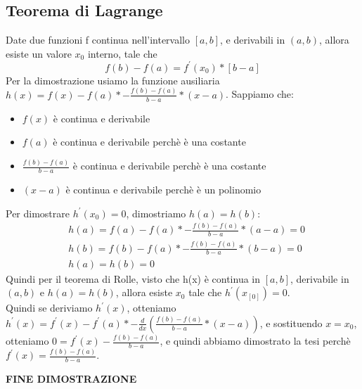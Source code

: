 \documentclass[11pt]{article}
\begin{document}
\subsection{Teorema di Lagrange}
Date due funzioni f continua nell'intervallo $[a,b]$, e derivabili in $(a,b)$, allora esiste un valore $x_{0}$ interno, tale che $$f(b)-f(a) = f^{'}(x_{0})*[b-a]$$
Per la dimostrazione usiamo la funzione ausiliaria $h(x) = f(x) - f(a)*-\frac{f(b)-f(a)}{b-a}*(x-a)$. Sappiamo che:\\
\begin{itemize}
    \item $f(x)$ è continua e derivabile
    \item $f(a)$ è continua e derivabile perchè è una costante
    \item $\frac{f(b)-f(a)}{b-a}$ è continua e derivabile perchè è una costante
    \item $(x-a)$ è continua e derivabile perchè è un polinomio
\end{itemize}
Per dimostrare $h^{'}(x_{0}) = 0$, dimostriamo $h(a) = h(b)$:\\
\begin{align*}
    &h(a) = f(a) - f(a)*-\frac{f(b)-f(a)}{b-a}*(a-a) = 0\\
    &h(b) = f(b) - f(a)*-\frac{f(b)-f(a)}{b-a}*(b-a) = 0\\
    &h(a) = h(b) = 0
\end{align*}
Quindi per il teorema di Rolle, visto che h(x) è continua in $[a,b]$, derivabile in $(a,b)$ e $h(a) = h(b)$, allora esiste $x_{0}$ tale che $h^{'}(x_[0]) = 0$.\\
Quindi se deriviamo $h^{'}(x)$, otteniamo $h^{'}(x) = f^{'}(x) - f^{'}(a)*-\frac{d}{dx}(\frac{f(b)-f(a)}{b-a}*(x-a))$, e sostituendo $x = x_{0}$, otteniamo $0 = f^{'}(x) -\frac{f(b)-f(a)}{b-a}$, 
e quindi abbiamo dimostrato la tesi perchè $f^{'}(x) = \frac{f(b)-f(a)}{b-a}$.\\
\begin{center}
    \textbf{FINE DIMOSTRAZIONE}
\end{center}
\end{document}
